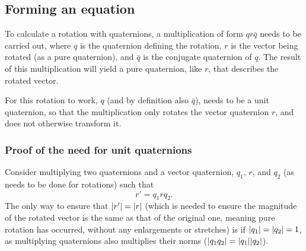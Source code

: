 \documentclass[12pt]{article}
\theoremstyle{definition}
\begin{document}
\subsection{Forming an equation}

To calculate a rotation with quaternions, a multiplication of form $qr\bar{q}$ \cite{DRose} needs to be carried out, where $q$ is the quaternion defining the rotation, $r$ is the vector being rotated (as a pure quaternion), and $\bar{q}$ is the conjugate quaternion of $q$. The result of this multiplication will yield a pure quaternion, like $r$, that describes the rotated vector.

For this rotation to work, $q$ (and by definition also $\bar{q}$), needs to be a unit quaternion, so that the multiplication only rotates the vector quaternion $r$, and does not otherwise transform it.

\subsubsection{Proof of the need for unit quaternions}

Consider multiplying two quaternions and a vector quaternion, $q_1$, $r$, and $q_2$ (as needs to be done for rotations) such that
\begin{equation}
    r' = q_1rq_2.
\end{equation}
The only way to ensure that $\abs{r'} = \abs{r}$ (which is needed to ensure the magnitude of the rotated vector is the same as that of the original one, meaning pure rotation has occurred, without any enlargements or stretches) is if $\abs{q_1} = \abs{q_2} = 1$, as multiplying quaternions also multiplies their norms ($\abs{q_1q_2} = \abs{q_1}\abs{q_2}$). \cite{Math431}
\end{document}
